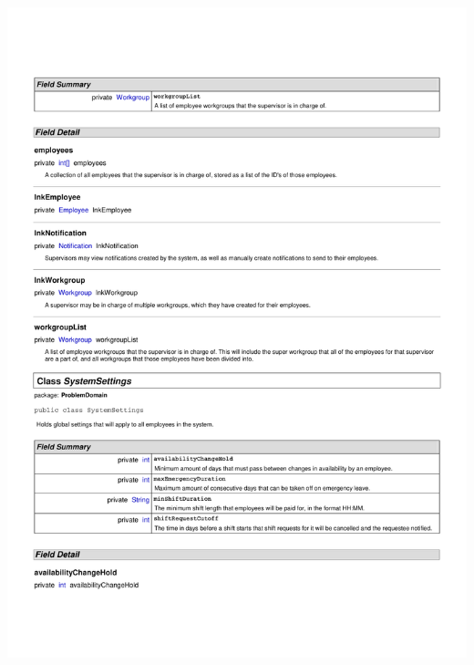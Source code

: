 \documentclass[letterpaper,12pt]{report}
\begin{document}
\includegraphics[scale=0.9,trim=20mm 30mm 25mm 25mm]{externals/ProblemDomainDataDictionary14.pdf}
\newpage
\end{document}

